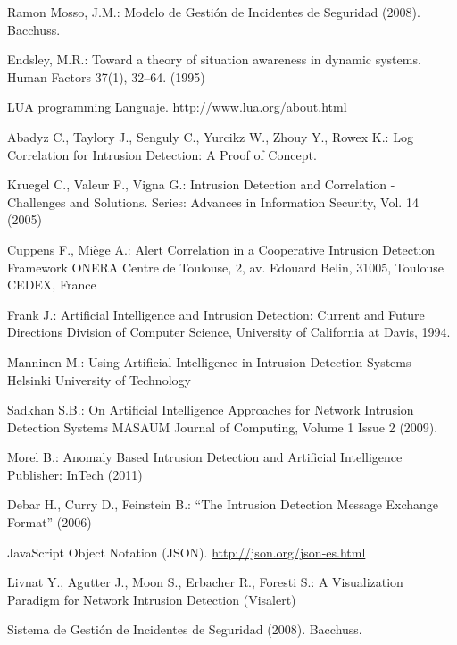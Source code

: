\documentclass[a4paper]{./plantillas/llncs}
\begin{document}
\begin{thebibliography}{4}

 Ramon Mosso, J.M.: Modelo de Gestión de Incidentes de Seguridad (2008). Bacchuss.

 Endsley, M.R.: Toward a theory of situation awareness in dynamic systems. Human Factors 37(1), 32–64. (1995)

 LUA programming Languaje. \url{http://www.lua.org/about.html}

 Abadyz C., Taylory J., Senguly C., Yurcikz W., Zhouy Y., Rowex K.: Log Correlation for Intrusion Detection: A Proof of Concept.

 Kruegel C., Valeur F., Vigna G.: Intrusion Detection and Correlation - Challenges and Solutions.
Series: Advances in Information Security, Vol. 14 (2005)

 Cuppens F., Miège A.: Alert Correlation in a Cooperative Intrusion Detection Framework
ONERA Centre de Toulouse, 2, av. Edouard Belin, 31005, Toulouse CEDEX, France

 Frank J.: Artificial Intelligence and Intrusion Detection: Current and Future Directions
Division of Computer Science, University of California at Davis, 1994.

 Manninen M.: Using Artificial Intelligence in Intrusion Detection Systems
Helsinki University of Technology

 Sadkhan S.B.: On Artificial Intelligence Approaches for Network Intrusion Detection Systems
MASAUM Journal of Computing, Volume 1 Issue 2 (2009).

 Morel B.: Anomaly Based Intrusion Detection and Artificial Intelligence 
Publisher: InTech (2011)

 Debar H., Curry D., Feinstein B.: “The Intrusion Detection Message Exchange Format” (2006)

 JavaScript Object Notation (JSON). \url{http://json.org/json-es.html}

 Livnat Y., Agutter J., Moon S., Erbacher R., Foresti S.: A Visualization Paradigm for Network Intrusion Detection (Visalert)

 Sistema de Gestión de Incidentes de Seguridad (2008). Bacchuss. 

\end{thebibliography}
\end{document}
